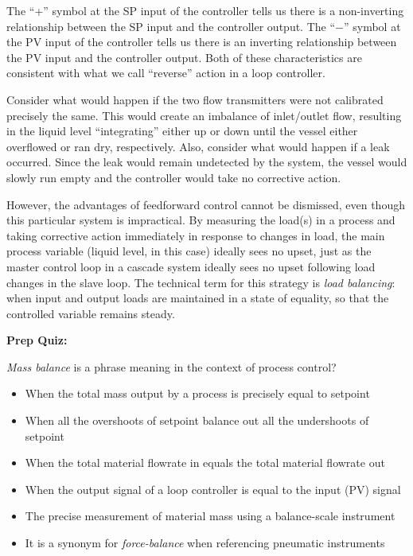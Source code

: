 The ``+'' symbol at the SP input of the controller tells us there is a non-inverting relationship between the SP input and the controller output.  The ``$-$'' symbol at the PV input of the controller tells us there is an inverting relationship between the PV input and the controller output.  Both of these characteristics are consistent with what we call ``reverse'' action in a loop controller.







Consider what would happen if the two flow transmitters were not calibrated precisely the same.  This would create an imbalance of inlet/outlet flow, resulting in the liquid level ``integrating'' either up or down until the vessel either overflowed or ran dry, respectively.  Also, consider what would happen if a leak occurred.  Since the leak would remain undetected by the system, the vessel would slowly run empty and the controller would take no corrective action.

However, the advantages of feedforward control cannot be dismissed, even though this particular system is impractical.  By measuring the load(s) in a process and taking corrective action immediately in response to changes in load, the main process variable (liquid level, in this case) ideally sees no upset, just as the master control loop in a cascade system ideally sees no upset following load changes in the slave loop.  The technical term for this strategy is {\it load balancing}: when input and output loads are maintained in a state of equality, so that the controlled variable remains steady.

\vfil \eject

\noindent
{\bf Prep Quiz:}

{\it Mass balance} is a phrase meaning  in the context of process control?

\begin{itemize}
\item{} When the total mass output by a process is precisely equal to setpoint
\vskip 5pt 
\item{} When all the overshoots of setpoint balance out all the undershoots of setpoint
\vskip 5pt 
\item{} When the total material flowrate in equals the total material flowrate out
\vskip 5pt 
\item{} When the output signal of a loop controller is equal to the input (PV) signal
\vskip 5pt 
\item{} The precise measurement of material mass using a balance-scale instrument
\vskip 5pt 
\item{} It is a synonym for {\it force-balance} when referencing pneumatic instruments
\end{itemize}




